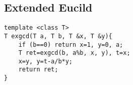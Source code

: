 \subsection{Extended Eucild}
\begin{lstlisting}
template <class T>
T exgcd(T a, T b, T &x, T &y){
	if (b==0) return x=1, y=0, a;
	T ret=exgcd(b, a%b, x, y), t=x;
	x=y, y=t-a/b*y;
	return ret;
}
\end{lstlisting}
